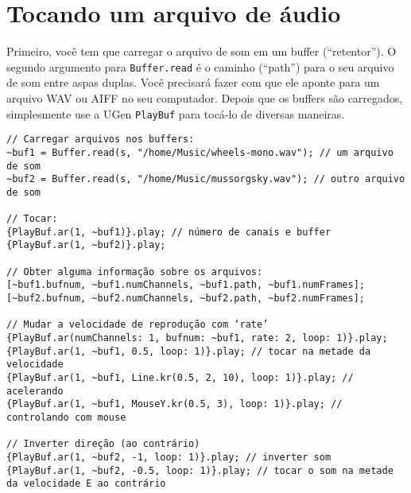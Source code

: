 \section{Tocando um arquivo de áudio}

Primeiro, você tem que carregar o arquivo de som em um buffer (“retentor”). O segundo argumento para \texttt{Buffer.read} é o caminho (“path”) para o seu arquivo de som entre aspas duplas. Você precisará fazer com que ele aponte para um arquivo WAV ou AIFF no seu computador. Depois que os buffers são carregados, simplesmente use a UGen \texttt{PlayBuf} para tocá-lo de diversas maneiras.

\bigskip
{}
\bigskip

\begin{lstlisting}[style=SuperCollider-IDE, basicstyle=\scttfamily\footnotesize]
// Carregar arquivos nos buffers:
~buf1 = Buffer.read(s, "/home/Music/wheels-mono.wav"); // um arquivo de som
~buf2 = Buffer.read(s, "/home/Music/mussorgsky.wav"); // outro arquivo de som

// Tocar:
{PlayBuf.ar(1, ~buf1)}.play; // número de canais e buffer
{PlayBuf.ar(1, ~buf2)}.play;

// Obter alguma informação sobre os arquivos:
[~buf1.bufnum, ~buf1.numChannels, ~buf1.path, ~buf1.numFrames];
[~buf2.bufnum, ~buf2.numChannels, ~buf2.path, ~buf2.numFrames];

// Mudar a velocidade de reprodução com ‘rate’ 
{PlayBuf.ar(numChannels: 1, bufnum: ~buf1, rate: 2, loop: 1)}.play;
{PlayBuf.ar(1, ~buf1, 0.5, loop: 1)}.play; // tocar na metade da velocidade
{PlayBuf.ar(1, ~buf1, Line.kr(0.5, 2, 10), loop: 1)}.play; // acelerando
{PlayBuf.ar(1, ~buf1, MouseY.kr(0.5, 3), loop: 1)}.play; // controlando com mouse

// Inverter direção (ao contrário)
{PlayBuf.ar(1, ~buf2, -1, loop: 1)}.play; // inverter som
{PlayBuf.ar(1, ~buf2, -0.5, loop: 1)}.play; // tocar o som na metade da velocidade E ao contrário
\end{lstlisting}
